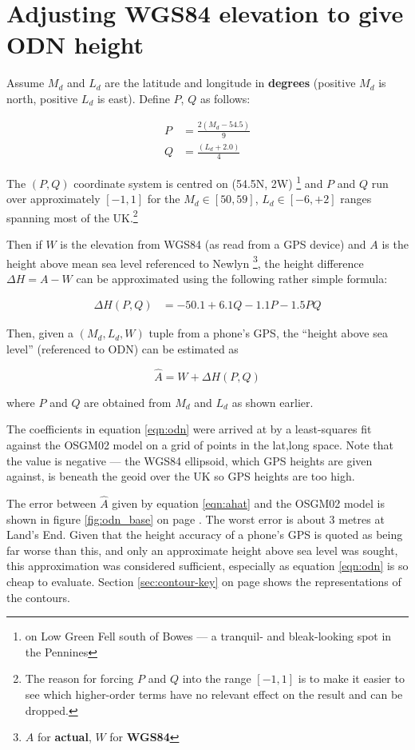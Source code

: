 \documentclass[10pt,a4paper]{article}
\begin{document}
\section {Adjusting WGS84 elevation to give ODN height}
Assume $M_d$ and $L_d$ are the latitude and longitude in \textbf{degrees}
(positive $M_d$ is north, positive $L_d$ is east).  Define $P$, $Q$ as follows:

\begin{align}
P & = \frac{2\left(M_d - 54.5\right)}{9} \\
  Q & = \frac{\left(L_d + 2.0\right)}{4}
\end{align}

The $(P,Q)$ coordinate system is centred on (54.5\degree{}N, 2\degree{}W)
\footnote{on Low Green Fell south of Bowes --- a tranquil- and bleak-looking
spot in the Pennines}
and $P$ and $Q$ run over approximately $[-1,1]$ for the $M_d \in [50,59]$, $L_d
\in [-6,+2]$ ranges spanning most of the UK.\footnote{The reason for forcing
$P$ and $Q$ into the range $[-1,1]$ is to make it easier to see which
higher-order terms have no relevant effect on the result and can be dropped.}

Then if $W$ is the elevation from WGS84 (as read from a GPS device) and $A$ is
the height above mean sea level referenced to Newlyn
\footnote{$A$ for \textbf{actual}, $W$ for \textbf{WGS84}},
the height difference $\Delta H = A-W$ can be approximated using the following
rather simple formula:

\begin{align}
  \Delta H(P,Q) &= -50.1 + 6.1Q - 1.1P - 1.5 PQ
  \label{eqn:odn}
\end{align}

Then, given a $(M_d,L_d,W)$ tuple from a phone's GPS, the ``height above sea
level'' (referenced to ODN) can be estimated as

\begin{equation}
\hat{A} = W + \Delta H(P,Q)
\label{eqn:ahat}
\end{equation}

where $P$ and $Q$ are obtained from $M_d$ and $L_d$ as shown earlier.

The coefficients in equation \eqref{eqn:odn} were arrived at by a least-squares
fit against the OSGM02 model on a grid of points in the lat,long space.  Note
that the value is negative --- the WGS84 ellipsoid, which GPS heights are given
against, is beneath the geoid over the UK so GPS heights are too high.

The error between $\hat{A}$ given by equation \eqref{eqn:ahat} and the OSGM02
model is shown in figure \ref{fig:odn_base} on page \pageref{fig:odn_base}.  The worst
error is about 3 metres at Land's End.  Given that the height accuracy of a
phone's GPS is quoted as being far worse than this, and only an approximate
height above sea level was sought, this approximation was considered
sufficient, especially as equation \eqref{eqn:odn} is so cheap to evaluate.
Section \ref{sec:contour-key} on page \pageref{sec:contour-key} shows the
representations of the contours.
\end{document}
